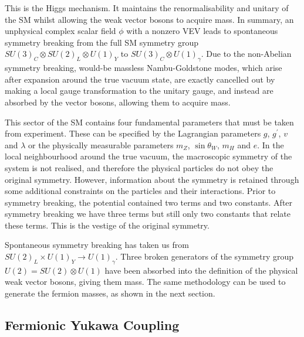 This is the Higgs mechanism.
It maintains the renormalisability and unitary of the SM whilst allowing the weak vector bosons to acquire mass.
In summary, an unphysical complex scalar field $\phi$ with a nonzero VEV leads to spontaneous symmetry breaking from the full SM symmetry group $SU(3)_C \otimes SU(2)_L \otimes U(1)_Y$ to $SU(3)_C \otimes U(1)_\gamma$.
Due to the non-Abelian symmetry breaking, would\nobreakdash-be massless Nambu-Goldstone modes, which arise after expansion around the true vacuum state, are exactly cancelled out by making a local gauge transformation to the unitary gauge, and instead are absorbed by the vector bosons, allowing them to acquire mass.

This sector of the SM contains four fundamental parameters that must be taken from experiment.
These can be specified by the Lagrangian parameters $g$, $g^\prime$, $v$ and $\lambda$ or the physically measurable parameters $m_Z$, $\sin\theta_W$, $m_H$ and $e$.
In the local neighbourhood around the true vacuum, the macroscopic symmetry of the system is not realised, and therefore the physical particles do not obey the original symmetry. 
However, information about the symmetry is retained through some additional constraints on the particles and their interactions.
Prior to symmetry breaking, the potential contained two terms and two constants. After symmetry breaking we have three terms but still only two constants that relate these terms. This is the vestige of the original symmetry. %

Spontaneous symmetry breaking has taken us from $SU(2)_L \times U(1)_Y \rightarrow U(1)_{\gamma}$.
Three broken generators of the symmetry group $U(2) = SU(2) \otimes U(1)$ have been absorbed into the definition of the physical weak vector bosons, giving them mass.
The same methodology can be used to generate the fermion masses, as shown in the next section. 





\subsection{Fermionic Yukawa Coupling}\label{sec:higgs_yukawa_coupling}

